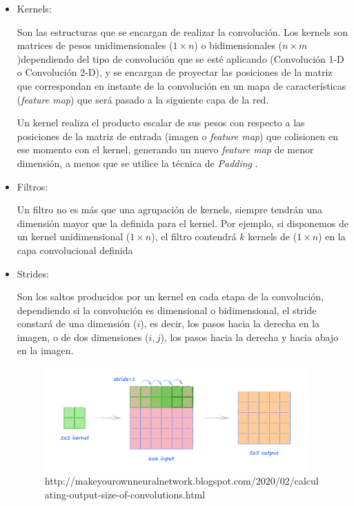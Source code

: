             \begin{itemize}

                \item Kernels:

                    Son las estructuras que se encargan de realizar la convolución. Los kernels son matrices de pesos unidimensionales ($1 \times n$) o bidimensionales ($n \times m$)dependiendo del tipo de convolución que se esté aplicando (Convolución 1-D o Convolución 2-D), y se encargan de proyectar las posiciones de la matriz que correspondan en instante de la convolución en un mapa de características (\textit{feature map}) que será pasado a la siguiente capa de la red.

                    Un kernel realiza el producto escalar de sus pesos con respecto a las posiciones de la matriz de entrada (imagen o \textit{feature map}) que colisionen en ese momento con el kernel, generando un nuevo \textit{feature map} de menor dimensión, a menos que se utilice la técnica de \textit{Padding} \cite{Kernels}.
                     
                \item Filtros:

                    Un filtro no es más que una agrupación de kernels, siempre tendrán una dimensión mayor que la definida para el kernel. Por ejemplo, si disponemos de un kernel unidimensional ($1 \times n$), el filtro contendrá $k$ kernels de ($1 \times n$) en la capa convolucional definida \cite{FiltersFeatureMaps}

                \item Strides:

                    Son los saltos producidos por un kernel en cada etapa de la convolución, dependiendo si la convolución es dimensional o bidimensional, el stride constará de una dimensión ($i$), es decir, los pasos hacia la derecha en la imagen, o de dos dimensiones ($i, j$), los pasos hacia la derecha y hacia abajo en la imagen.


                    \begin{figure}[h]
                        \centering
                        \includegraphics[width=10cm]{archivos/CNN/Stride}
                        \caption{http://makeyourownneuralnetwork.blogspot.com/2020/02/calculating-output-size-of-convolutions.html}
                        \label{StrideImage}
                     \end{figure}


\end{itemize}
